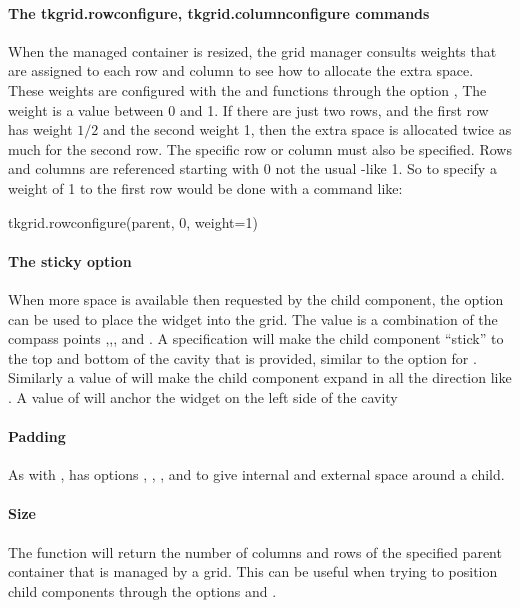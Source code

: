 \paragraph{The tkgrid.rowconfigure, tkgrid.columnconfigure commands}
When the managed container is resized, the grid manager consults
weights that are assigned to each row and column to see how to
allocate the extra space. These weights are configured with the
 and 
functions through the option
, The weight is a value
between 0 and 1. If there are just two rows, and the first row has weight
$1/2$ and the second weight 1, then the extra space is allocated twice
as much for the second row. The specific row or column must also be
specified. Rows and columns are referenced starting with 0 not the usual \R-like 1. So to specify
a weight of 1 to the first row would be done with a command like:


\begin{Schunk}
\begin{Sinput}
 tkgrid.rowconfigure(parent, 0, weight=1)
\end{Sinput}
\end{Schunk}

\paragraph{The sticky option}
When more space is available then requested by the child component, the  option can be used to place the widget into the grid. The value is a combination of the compass points ,,, and . A specification  will make the child component ``stick'' to the top and bottom of the cavity that is provided, similar to the  option for . Similarly a value of  will make the child component expand in all the direction like . A value of  will anchor the widget on the left side of the cavity

\paragraph{Padding}
As with ,  has options
, , ,
and  to give internal and external space around a
child.

\paragraph{Size}
The function  will return the number of columns and rows of the specified parent container that is managed by a grid. This can be useful when trying to position child components through the options  and .

